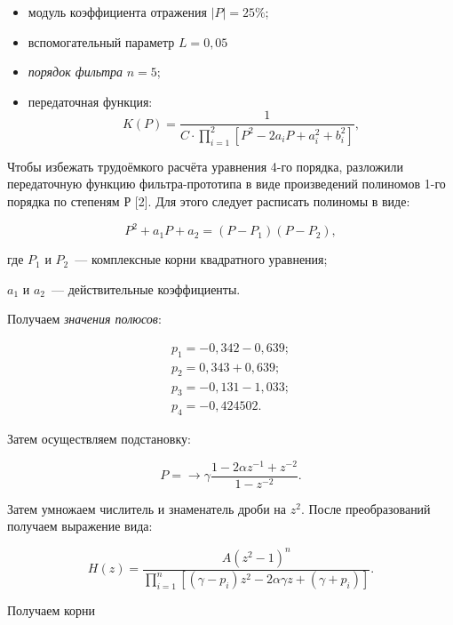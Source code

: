 \begin{itemize}
\item модуль коэффициента отражения $|P| = 25\%$;
\item вспомогательный параметр $L = 0{,}05$
\item \textit{порядок фильтра} $n = 5$;
\item передаточная функция:
  \begin{equation*}
    K(P) = \frac{1}{C \cdot \prod_{i =1}^2 \left[P^2 - 2a_iP + a_i^2
        + b_i^2\right]},
  \end{equation*}
\end{itemize}

\point Чтобы избежать трудоёмкого расчёта уравнения 4-го порядка,
разложили передаточную функцию фильтра-прототипа в виде произведений
полиномов 1-го порядка по степеням Р [2]. Для этого следует расписать
полиномы в виде:

\begin{equation*}
  P^2 + a_1P + a_2 = (P-P_1)(P-P_2),
\end{equation*}
\begin{ESKDexplanation}
\item[где ] $P_1$ и $P_2$~--- комплексные корни квадратного уравнения;
\item $a_1$ и $a_2$~--- действительные коэффициенты.
\end{ESKDexplanation}

Получаем \textit{значения полюсов}:

\begin{gather*}
  p_1 = -0{,}342 - 0{,}639;\\
  p_2 = 0{,}343 + 0{,}639;\\
  p_3 = -0{,}131 - 1{,}033;\\
  p_4 = -0{,}424502.
\end{gather*}

\point Затем осуществляем подстановку:

\begin{equation*}
  P = \rightarrow \gamma \frac{1 - 2 \alpha z^{-1}+z^{-2}}{1-z^{-2}}.
\end{equation*}

Затем умножаем числитель и знаменатель дроби на $z^2$. После
преобразований получаем выражение вида:

\begin{equation*}
  H(z) = \frac{A(z^2 - 1)^n}{\displaystyle \prod_{i=1}^n\left[(\gamma - p_i)z^2 -
      2\alpha \gamma z + (\gamma + p_i)\right]}.
\end{equation*}

Получаем корни

